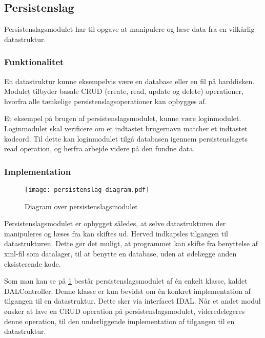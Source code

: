 \subsection{Persistenslag}
\label{sub:persistenslag}

Persistenslagsmodulet har til opgave at manipulere og læse data fra en vilkårlig datastruktur.

\subsubsection{Funktionalitet}
\label{ssub:persistenslag_funktionalitet}

En datastruktur kunne eksempelvis være en database eller en fil på harddisken. Modulet tilbyder basale CRUD (create, read, update og delete) operationer, hvorfra alle tænkelige persistenslagsoperationer kan opbygges af.

Et eksempel på brugen af persistenslagsmodulet, kunne være loginmodulet. Loginmodulet skal verificere om et indtastet brugernavn matcher et indtastet kodeord. Til dette kan loginmodulet tilgå databasen igennem persistenslagets read operation, og herfra arbejde videre på den fundne data.

\subsubsection{Implementation}
\label{ssub:persistenslag_implementation}
\begin{figure}
  \centering
  \texttt{[image: persistenslag-diagram.pdf]}
  \caption{Diagram over persistenslagsmodulet}
  \label{fig:permod}
\end{figure}

Persistenslagsmodulet er opbygget således, at selve datastrukturen der manipuleres og læses fra kan skiftes ud. Herved indkapsles tilgangen til datastrukturen. Dette gør det muligt, at programmet kan skifte fra benyttelse af xml-fil som datalager, til at benytte en database, uden at ødelægge anden eksisterende kode.

Som man kan se på \cref{fig:permod} består persistenslagsmodulet af én enkelt klasse, kaldet DALController. Denne klasse er kun bevidst om én konkret implementation af tilgangen til en datastruktur. Dette sker via interfacet IDAL. Når et andet modul ønsker at lave en CRUD operation på persistenslagsmodulet, videredelegeres denne operation, til den underliggende implementation af tilgangen til en datastruktur.
